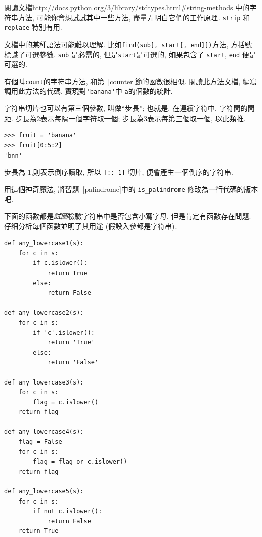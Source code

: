 \documentclass[10pt]{book}
\begin{document}
\begin{exercise}

閱讀文檔\url{http://docs.python.org/3/library/stdtypes.html#string-methods}
中的字符串方法, 
可能你會想試試其中一些方法, 盡量弄明白它們的工作原理. 
{\tt strip} 和 {\tt replace} 特別有用. 

文檔中的某種語法可能難以理解. 
比如\verb"find(sub[, start[, end]])"方法, 方括號標識了可選參數. 
 {\tt sub} 是必需的, 但是{\tt start}是可選的, 
如果包含了 {\tt start}, {\tt end} 便是可選的. 

\end{exercise}


\begin{exercise}

有個叫{\tt count}的字符串方法, 和第~\ref{counter}節的函數很相似. 
閱讀此方法文檔, 編寫調用此方法的代碼, 實現對\verb"'banana'"中
{\tt a}的個數的統計.
\end{exercise}


\begin{exercise}

字符串切片也可以有第三個參數, 叫做``步長'';
也就是, 在連續字符中, 字符間的間距. 
步長為2表示每隔一個字符取一個;
步長為3表示每第三個取一個, 以此類推. 

\begin{verbatim}
>>> fruit = 'banana'
>>> fruit[0:5:2]
'bnn'
\end{verbatim}
步長為-1,則表示倒序讀取, 所以 \verb"[::-1]" 切片, 
便會產生一個倒序的字符串. 

用這個神奇魔法, 將習題~\ref{palindrome}中的 \verb"is_palindrome"
修改為一行代碼的版本吧. 
\end{exercise}


\begin{exercise}

下面的函數都是{\em 試圖}檢驗字符串中是否包含小寫字母, 
但是肯定有函數存在問題. 
仔細分析每個函數並明了其用途
(假設入參都是字符串).

\begin{verbatim}
def any_lowercase1(s):
    for c in s:
        if c.islower():
            return True
        else:
            return False

def any_lowercase2(s):
    for c in s:
        if 'c'.islower():
            return 'True'
        else:
            return 'False'

def any_lowercase3(s):
    for c in s:
        flag = c.islower()
    return flag

def any_lowercase4(s):
    flag = False
    for c in s:
        flag = flag or c.islower()
    return flag

def any_lowercase5(s):
    for c in s:
        if not c.islower():
            return False
    return True
\end{verbatim}

\end{exercise}
\end{document}
